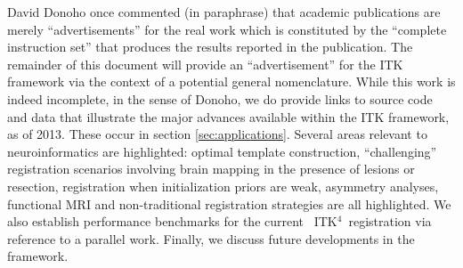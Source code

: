 \documentclass{frontiersSCNS}
\newcommand{\tk}{~ITK$^{\text{4}}$~}
\begin{document}



David Donoho once commented (in paraphrase) that academic publications
are merely ``advertisements'' for the real work which is constituted
by the ``complete instruction set'' that produces the results reported
in the publication.  The remainder of this document will provide an
``advertisement'' for the ITK framework via the context of a potential
general nomenclature.  While this work is indeed incomplete, in the
sense of Donoho, we do provide links to source code and data that
illustrate the major advances available within the ITK framework, as
of 2013.  These occur in section \ref{sec:applications}.  Several
areas relevant to neuroinformatics are highlighted: optimal template
construction, ``challenging'' registration scenarios involving brain
mapping in the presence of lesions or resection, registration when
initialization priors are weak, asymmetry analyses, functional MRI and
non-traditional registration strategies are all highlighted.  We also
establish performance benchmarks for the current \tk registration via
reference to a parallel work.  Finally, we discuss future developments
in the framework.
\end{document}
